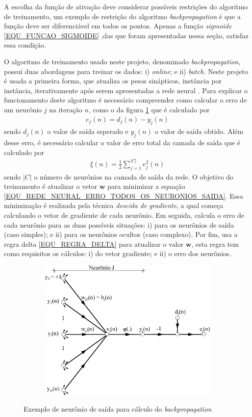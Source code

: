 A escolha da função de ativação deve considerar possíveis restrições do algoritmo de treinamento, um exemplo de restrição do algoritmo \emph{backpropagation} é que a função deve ser diferenciável em todos os pontos. Apenas a função \emph{sigmoide} \eqref{EQU_FUNCAO_SIGMOIDE} ,das que foram apresentadas nessa seção, satisfaz essa condição.

O algoritmo de treinamento usado neste projeto, denominado \emph{backpropagation}, possui duas abordagens para treinar os dados: i) \emph{online}; e ii) \emph{batch}. Neste projeto é usada a primeira forma, que atualiza os pesos sinápticos, instância por instância, iterativamente após serem apresentadas a rede neural \cite{Haykin2007}. Para explicar o funcionamento deste algoritmo é necessário compreender como calcular o erro de um neurônio \(j\) na iteração \(n\), como o da figura \ref{FIGURA_REDE_NEURAL_NEURONIO_BACKPROPAGATION} que é calculado por
\begin{align}
e_{j}(n) = d_{j}(n) - y_{j}(n)	\label{EQU_REDE_NEURAL_ERRO_NEURONIO_J}
\end{align}
sendo \(d_{j}(n)\) o valor de saída esperado e \(y_{j}(n)\) o valor de saída obtido. Além desse erro, é necessário calcular o valor de erro total da camada de saída que é calculado por
\begin{align}
\xi(n) = \frac{1}{2} \sum\limits_{j = 1}^{|C|} e_{j}^{2}(n)	\label{EQU_REDE_NEURAL_ERRO_TODOS_OS_NEURONIOS_SAIDA}
\end{align}
sendo \(|C|\) o número de neurônios na camada de saída da rede. O objetivo do treinamento é atualizar o vetor \(\mathbf{w}\) para minimizar a equação \eqref{EQU_REDE_NEURAL_ERRO_TODOS_OS_NEURONIOS_SAIDA}. Essa minimização é realizada pela técnica \emph{descida de gradiente}, a qual começa calculando o vetor de gradiente de cada neurônio. Em seguida, calcula o erro de cada neurônio para as duas possíveis situações: i) para os neurônios de saída (caso simples); e ii) para os neurônios ocultos (caso complexo). Por fim, usa a regra delta \eqref{EQU_REGRA_DELTA} para atualizar o valor \(\mathbf{w}\), esta regra tem como requisitos os cálculos: i) do vetor gradiente; e ii) o erro dos neurônios.
\begin{figure}[hbt]
	\centering
 	  \caption{Exemplo de neurônio de saída para cálculo do \emph{backpropagation}}
		\includegraphics[width=13cm,height=7cm]{./secoes/conceitosFundamentais/pics/img/umNeuronio.eps}
	\label{FIGURA_REDE_NEURAL_NEURONIO_BACKPROPAGATION}
\end{figure}

